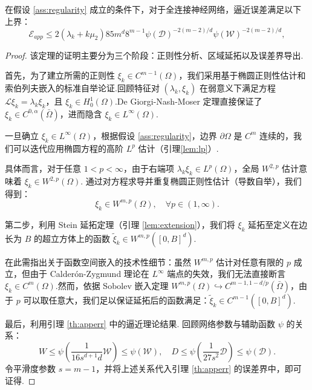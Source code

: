 \begin{theorem}\label{th4.3}
在假设 \ref{ass:regularity} 成立的条件下，对于全连接神经网络，逼近误差满足以下上界：
\begin{equation*}
\mathcal{E}_{app}\leq 2\left(\lambda_{k}+k\mu_{2}\right)85m^{d} 8^{m-1} \psi(\mathcal{D})^{-2(m-2) / d} \psi(\mathcal{W})^{-2(m-2) / d},
\end{equation*}
\end{theorem}
\begin{proof}
该定理的证明主要分为三个阶段：正则性分析、区域延拓以及误差界导出.

首先，为了建立所需的正则性 $\xi_{k} \in C^{m-1}(\Omega)$，我们采用基于椭圆正则性估计和索伯列夫嵌入的标准自举论证.回顾特征对 $(\lambda_k, \xi_k)$ 在弱意义下满足方程 $\mathcal{L} \xi_k = \lambda_k \xi_k$，且 $\xi_k \in H^1_0(\Omega)$.De Giorgi-Nash-Moser 定理直接保证了 $\xi_k \in C^{0,\alpha}(\bar{\Omega})$，进而隐含 $\xi_k \in L^\infty(\Omega)$.

一旦确立 $\xi_k \in L^\infty(\Omega)$，根据假设 \ref{ass:regularity}，边界 $\partial \Omega$ 是 $C^m$ 连续的，我们可以迭代应用椭圆方程的高阶 $L^p$ 估计（引理\ref{lem:lp}）.

具体而言，对于任意 $1 < p < \infty$，由于右端项 $\lambda_k \xi_k \in L^p(\Omega)$，全局 $W^{2,p}$ 估计意味着 $\xi_k \in W^{2,p}(\Omega)$.
通过对方程求导并重复椭圆正则性估计（导数自举），我们得到：
\begin{equation}\label{eq:high_reg}
\xi_k \in W^{m, p}(\Omega), \quad \forall p \in (1, \infty).
\end{equation}

第二步，利用 Stein 延拓定理（引理 \ref{lem:extension}），我们将 $\xi_{k}$ 延拓至定义在边长为 $B$ 的超立方体上的函数 $\tilde{\xi}_{k} \in W^{m, p}([0,B]^d)$.

在此需指出关于函数空间嵌入的技术性细节：虽然 $W^{m,p}$ 估计对任意有限的 $p$ 成立，但由于 Calderón-Zygmund 理论在 $L^\infty$ 端点的失效，我们无法直接断言 $\xi_k \in C^m(\Omega)$.然而，依据 Sobolev 嵌入定理 $W^{m,p}(\Omega) \hookrightarrow C^{m-1, 1-d/p}(\bar{\Omega})$，由于 $p$ 可以取任意大，我们足以保证延拓后的函数满足：$\tilde{\xi}_{k}\in C^{m-1}([0,B]^d)$.

最后，利用引理 \ref{th:apperr} 中的逼近理论结果.
回顾网络参数与辅助函数 $\psi$ 的关系：
\begin{equation*}
W\leq \psi(\frac{1}{16s^{d+1}d}\mathcal{W})\leq\psi(\mathcal{W}),
\quad D\leq \psi(\frac{1}{27s^2}\mathcal{D})\leq\psi({\mathcal{D}}).
\end{equation*}
令平滑度参数 $s=m-1$，并将上述关系代入引理 \ref{th:apperr} 的误差界中，即可证得.
\end{proof}

